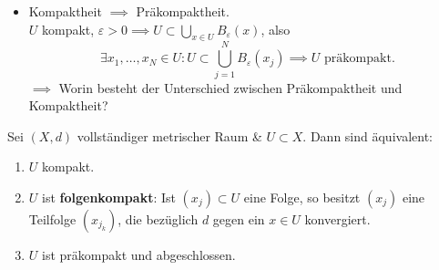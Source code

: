 \begin{itemize}
	\item Kompaktheit $ \implies  $ Präkompaktheit.\\
		$ U $ kompakt, $ \varepsilon > 0 \implies U \subset \bigcup_{x \in U} B_{\varepsilon}(x)  $, also
		\[
			\exists x_1, \dotsc, x_N \in U : U \subset \bigcup_{j = 1} ^N B_{\varepsilon}(x_j) \implies U \text{ präkompakt} .
		\]
		$ \implies  $  Worin besteht der Unterschied zwischen Präkompaktheit und Kompaktheit?
\end{itemize}

\begin{subtheorem}
	Sei $ (X, d) $ vollständiger metrischer Raum \& $ U \subset X $.
	Dann sind äquivalent:
	\begin{enumerate}[label=(\roman*)]
		\item $ U $ kompakt.
		\item $ U $ ist \textbf{folgenkompakt}: Ist $ (x_j) \subset  U $ eine Folge, so besitzt $ (x_j) $ eine Teilfolge $ (x_{j_k} ) $, die bezüglich $ d $ gegen ein $ x \in U $ konvergiert.
		\item $ U $ ist präkompakt und abgeschlossen.
	\end{enumerate}
\end{subtheorem}

